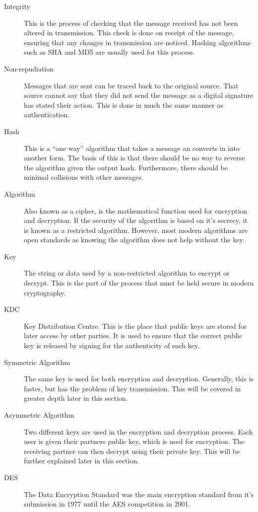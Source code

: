 \begin{description}
				\item[Integrity] 
					This is the process of checking that the message received has not been altered in transmission. 
					This check is done on receipt of the message, ensuring that any changes in transmission are noticed. 
					Hashing algorithms such as SHA and MD5 are usually used for this process. 
				\item[Non-repudiation]
					Messages that are sent can be traced back to the original source. 
					That source cannot say that they did not send the message as a digital signature has stated their action. 
					This is done in much the same manner as authentication. 
				\item[Hash]
					This is a ``one way'' algorithm that takes a message an converts in into another form. 
					The basis of this is that there should be no way to reverse the algorithm given the output hash. 
					Furthermore, there should be minimal collisions with other messages. 
				\item[Algorithm] Also known as a cipher, is the mathematical function used for encryption and decryption. 
					If the security of the algorithm is based on it's secrecy, it is known as a restricted algorithm. 
					However, most modern algorithms are open standards as knowing the algorithm does not help without the key. 
				\item[Key] The string or data used by a non-restricted algorithm to encrypt or decrypt. 
					This is the part of the process that must be held secure in modern cryptography. 
				\item[KDC] Key Distribution Centre. 
					This is the place that public keys are stored for later access by other parties. 
					It is used to ensure that the correct public key is released by signing for the authenticity of each key. 
				\item[Symmetric Algorithm] The same key is used for both encryption and decryption. 
					Generally, this is faster, but has the problem of key transmission. 
					This will be covered in greater depth later in this section. 
				\item[Asymmetric Algorithm] Two different keys are used in the encryption and decryption process. 
					Each user is given their partners public key, which is used for encryption. 
					The receiving partner can then decrypt using their private key. 
					This will be further explained later in this section. 
				\item[DES] The Data Encryption Standard was the main encryption standard from it's submission in 1977 until the AES competition in 2001.

\end{description}

